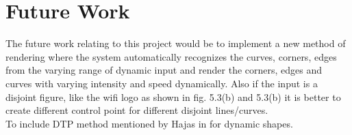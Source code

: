 %

\chapter{Future Work}
\label{sec:futurework}
The future work relating to this project would be to implement a new method of 
rendering where the system automatically recognizes the curves, corners, 
edges from the varying range of dynamic input and render the corners, edges 
and curves with varying intensity and speed dynamically. Also if the input 
is a disjoint figure, like the wifi logo as shown in fig. 5.3(b) and 5.3(b) it is 
better to create different control point for different disjoint lines/curves.\\
To include DTP method mentioned by Hajas in \cite{Hajas2020} for dynamic shapes.
